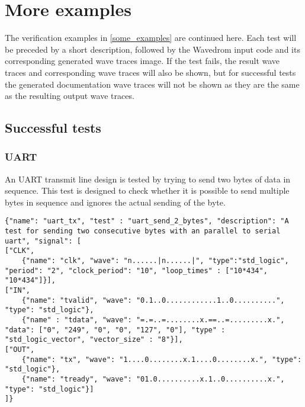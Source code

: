 \pagestyle{mylandscape}
\chapter{More examples}
The verification examples in \ref{some_examples} are continued here. Each test will be preceded by a short description, followed by the Wavedrom input code and its corresponding generated wave traces image. If the test fails, the result wave traces and corresponding wave traces will also be shown, but for successful tests the generated documentation wave traces will not be shown as they are the same as the resulting output wave traces.\newpage
{}
\section{Successful tests}
\subsection{UART}
An UART transmit line design is tested by trying to send two bytes of data in sequence. This test is designed to check whether it is possible to send multiple bytes in sequence and ignores the actual sending of the byte.
\npar
\begin{lstlisting}[style=json, caption={Functionality test for the UART design in appendix \ref{appendix:uart}}, label={json:uart}]
{"name": "uart_tx", "test" : "uart_send_2_bytes", "description": "A test for sending two consecutive bytes with an parallel to serial uart", "signal": [
["CLK",
	{"name": "clk", "wave": "n......|n......|", "type":"std_logic", "period": "2", "clock_period": "10", "loop_times" : ["10*434", "10*434"]}],
["IN",
	{"name": "tvalid", "wave": "0.1..0............1..0..........", "type": "std_logic"},
	{"name" : "tdata", "wave": "=.=..=........x.==..=.........x.", "data": ["0", "249", "0", "0", "127", "0"], "type" : "std_logic_vector", "vector_size" : "8"}],
["OUT",
	{"name": "tx", "wave": "1....0........x.1....0........x.", "type": "std_logic"},
	{"name": "tready", "wave": "01.0..........x.1..0..........x.", "type": "std_logic"}]
]}
\end{lstlisting}
\clearpage
